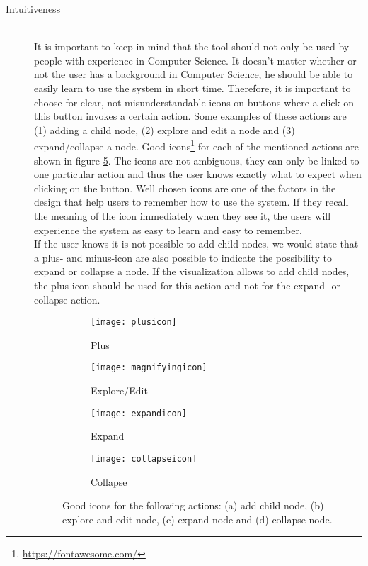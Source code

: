 \begin{description}
	\item[Intuitiveness] \hfill \\
	It is important to keep in mind that the tool should not only be used by people with experience in Computer Science. It doesn't matter whether or not the user has a background in Computer Science, he should be able to easily learn to use the system in short time. Therefore, it is important to choose for clear, not misunderstandable icons on buttons where a click on this button invokes a certain action. Some examples of these actions are (1) adding a child node, (2) explore and edit a node and (3) expand/collapse a node. Good icons\footnote{\url{https://fontawesome.com/}} for each of the mentioned actions are shown in figure \ref{fig:icons}. The icons are not ambiguous, they can only be linked to one particular action and thus the user knows exactly what to expect when clicking on the button. Well chosen icons are one of the factors in the design that help users to remember how to use the system. If they recall the meaning of the icon immediately when they see it, the users will experience the system as easy to learn and easy to remember.\\
	
	If the user knows it is not possible to add child nodes, we would state that a plus- and minus-icon are also possible to indicate the possibility to expand or collapse a node. If the visualization allows to add child nodes, the plus-icon should be used for this action and not for the expand- or collapse-action.

\begin{figure}[H]
	\centering
	\begin{subfigure}{.2\textwidth}
  		\centering
  		\texttt{[image: plusicon]}
  		\caption{Plus}
  		\label{fig:plusicon}
	\end{subfigure}%
	\begin{subfigure}{.2\textwidth}
  		\centering
  		\texttt{[image: magnifyingicon]}
  		\caption{Explore/Edit}
  		\label{fig:editicon}
	\end{subfigure}
	\begin{subfigure}{.2\textwidth}
  		\centering
  		\texttt{[image: expandicon]}
  		\caption{Expand}
  		\label{fig:expandicon}
	\end{subfigure}
	\begin{subfigure}{.2\textwidth}
  		\centering
  		\texttt{[image: collapseicon]}
  		\caption{Collapse}
  		\label{fig:collapseicon}
	\end{subfigure}
	\caption{Good icons for the following actions: (a) add child node, (b) explore and edit node, (c) expand node and (d) collapse node.}
	\label{fig:icons}
\end{figure}
	
\end{description}